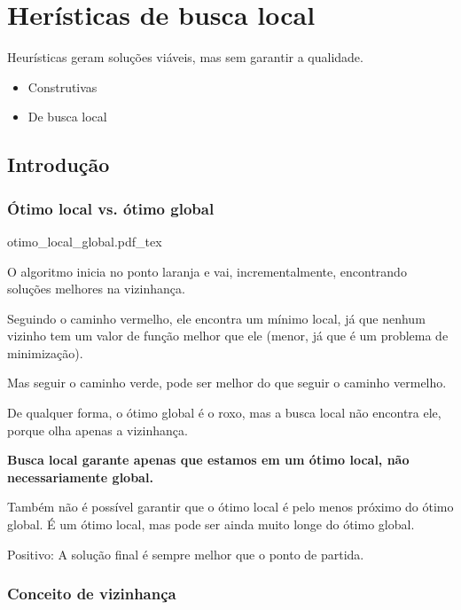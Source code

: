\chapter{Herísticas de busca local}

Heurísticas geram soluções viáveis, mas sem garantir a qualidade.

\begin{itemize}
    \item Construtivas
    \item De busca local
\end{itemize}

\section{Introdução}

\subsection{Ótimo local vs. ótimo global}

\begin{center}
    \def\svgwidth{.75\linewidth}
    {otimo_local_global.pdf_tex}
\end{center}

O algoritmo inicia no ponto laranja e vai, incrementalmente, encontrando soluções melhores na vizinhança.

Seguindo o caminho vermelho, ele encontra um mínimo local, já que nenhum vizinho tem um valor de função melhor que ele (menor, já que é um problema de minimização).

Mas seguir o caminho verde, pode ser melhor do que seguir o caminho vermelho.

De qualquer forma, o ótimo global é o roxo, mas a busca local não encontra ele, porque olha apenas a vizinhança.

\textbf{Busca local garante apenas que estamos em um ótimo local, não necessariamente global.}

Também não é possível garantir que o ótimo local é pelo menos próximo do ótimo global. É um ótimo local, mas pode ser ainda muito longe do ótimo global.

Positivo: A solução final é sempre melhor que o ponto de partida.

\subsection{Conceito de vizinhança}

